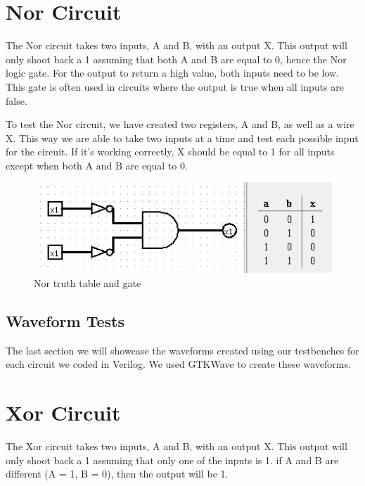\documentclass[12pt]{article}
\begin{document}
\section{Nor Circuit}
The Nor circuit takes two inputs, A and B, with an output X. This output will only shoot back a 1 assuming that both A and B are equal to 0, hence the Nor logic gate. For the output to return a high value, both inputs need to be low. This gate is often used in circuits where the output is true when all inputs are false.


To test the Nor circuit, we have created two registers, A and B, as well as a wire X. This way we are able to take two inputs at a time and test each possible input for the circuit. If it's working correctly, X should be equal to 1 for all inputs except when both A and B are equal to 0. 


\begin{figure}[h]
    \centering
    \includegraphics[width = 1.0\textwidth]{figs/Nor CircuitTruth.png}
    \caption{Nor truth table and gate}
    \label{fig:enter-label}
\end{figure}

\newpage

\subsection{Waveform Tests}

The last section we will showcase the waveforms created using our testbenches for each circuit we coded in Verilog. We used GTKWave to create these waveforms.







\section{Xor Circuit}
The Xor circuit takes two inputs, A and B, with an output X. This output will only shoot back a 1 assuming that only one of the inputs is 1. if A and B are different (A = 1, B = 0), then the output will be 1. 

\end{document}
